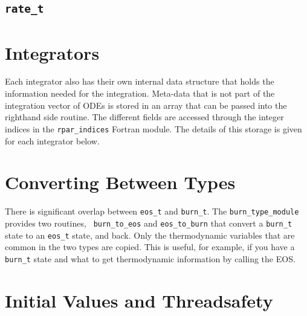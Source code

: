 \subsection{{\tt rate\_t}}



\section{Integrators}

Each integrator also has their own internal data structure that holds
the information needed for the integration.  Meta-data that is not
part of the integration vector of ODEs is stored in an array that can
be passed into the righthand side routine.  The different fields are
accessed through the integer indices in the {\tt rpar\_indices}
Fortran module.  The details of this storage is given for each
integrator below.


\section{Converting Between Types}

There is significant overlap between {\tt eos\_t} and {\tt burn\_t}.
The {\tt burn\_type\_module} provides two routines, {\tt
  burn\_to\_eos} and {\tt eos\_to\_burn} that convert a {\tt burn\_t}
state to an {\tt eos\_t} state, and back.  Only the thermodynamic
variables that are common in the two types are copied.  This is
useful, for example, if you have a {\tt burn\_t} state and what to get
thermodynamic information by calling the EOS.


\section{Initial Values and Threadsafety}

